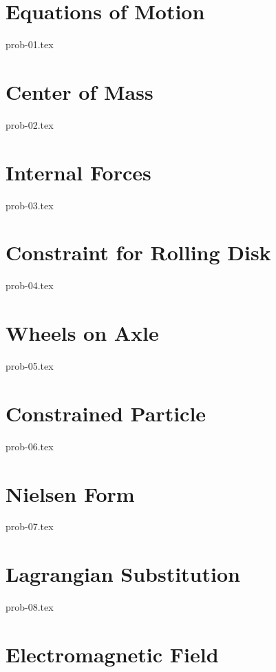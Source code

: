 \section{Equations of Motion}

{prob-01.tex}

\section{Center of Mass}

{prob-02.tex}

\section{Internal Forces}

{prob-03.tex}

\section{Constraint for Rolling Disk}\label{rollingdisk}

{prob-04.tex}

\section{Wheels on Axle}

{prob-05.tex}

\section{Constrained Particle}

{prob-06.tex}

\section{Nielsen Form}\label{nielsen}

{prob-07.tex}

\section{Lagrangian Substitution}\label{lagrangeinv}

{prob-08.tex}

\section{Electromagnetic Field}

